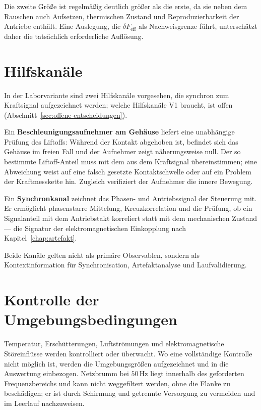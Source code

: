 \documentclass[12pt,a4paper]{report}
\begin{document}
Die zweite Größe ist regelmäßig deutlich größer als die erste, da sie
neben dem Rauschen auch Aufsetzen, thermischen Zustand und
Reproduzierbarkeit der Antriebe enthält. Eine Auslegung, die
$\delta F_{\text{eff}}$ als Nachweisgrenze führt, unterschätzt daher die
tatsächlich erforderliche Auflösung.

\section{Hilfskanäle}

In der Laborvariante sind zwei Hilfskanäle vorgesehen, die synchron zum
Kraftsignal aufgezeichnet werden; welche Hilfskanäle V1 braucht, ist offen
(Abschnitt~\ref{sec:offene-entscheidungen}).

Ein \textbf{Beschleunigungsaufnehmer am Gehäuse} liefert eine
unabhängige Prüfung des Liftoffs: Während der Kontakt abgehoben ist,
befindet sich das Gehäuse im freien Fall und der Aufnehmer zeigt
näherungsweise null. Der so bestimmte Liftoff-Anteil muss mit dem aus
dem Kraftsignal übereinstimmen; eine Abweichung weist auf eine falsch
gesetzte Kontaktschwelle oder auf ein Problem der Kraftmesskette hin.
Zugleich verifiziert der Aufnehmer die innere Bewegung.

Ein \textbf{Synchronkanal} zeichnet das Phasen- und Antriebssignal der
Steuerung mit. Er ermöglicht phasenstarre Mittelung, Kreuzkorrelation
und die Prüfung, ob ein Signalanteil mit dem Antriebstakt korreliert
statt mit dem mechanischen Zustand --- die Signatur der
elektromagnetischen Einkopplung nach Kapitel~\ref{chap:artefakt}.

Beide Kanäle gelten nicht als primäre Observablen, sondern als
Kontextinformation für Synchronisation, Artefaktanalyse und
Laufvalidierung.

\section{Kontrolle der Umgebungsbedingungen}

Temperatur, Erschütterungen, Luftströmungen und elektromagnetische
Störeinflüsse werden kontrolliert oder überwacht. Wo eine vollständige
Kontrolle nicht möglich ist, werden die Umgebungsgrößen aufgezeichnet
und in die Auswertung einbezogen. Netzbrumm bei $50\,\mathrm{Hz}$ liegt
innerhalb des geforderten Frequenzbereichs und kann nicht weggefiltert
werden, ohne die Flanke zu beschädigen; er ist durch Schirmung und
getrennte Versorgung zu vermeiden und im Leerlauf nachzuweisen.
\end{document}
